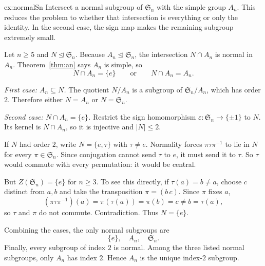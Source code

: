 \begin{solution}{ex:normalSn}
\idea Intersect a normal subgroup of $\mathfrak S_n$ with the simple group $A_n$. This reduces the problem to whether that intersection is everything or only the identity. In the second case, the sign map makes the remaining subgroup extremely small.

\writeup Let $n\ge5$ and $N\trianglelefteq\mathfrak S_n$. Because $A_n\trianglelefteq\mathfrak S_n$, the intersection $N\cap A_n$ is normal in $A_n$. Theorem~\ref{thm:an} says $A_n$ is simple, so
\[
N\cap A_n=\{e\}\qquad\text{or}\qquad N\cap A_n=A_n.
\]

\emph{First case: $A_n\subseteq N$.} The quotient $N/A_n$ is a subgroup of $\mathfrak S_n/A_n$, which has order $2$. Therefore either $N=A_n$ or $N=\mathfrak S_n$.

\emph{Second case: $N\cap A_n=\{e\}$.} Restrict the sign homomorphism $\varepsilon:\mathfrak S_n\to\{\pm1\}$ to $N$. Its kernel is $N\cap A_n$, so it is injective and $|N|\le2$.

If $N$ had order $2$, write $N=\{e,\tau\}$ with $\tau\ne e$. Normality forces $\pi\tau\pi^{-1}$ to lie in $N$ for every $\pi\in\mathfrak S_n$. Since conjugation cannot send $\tau$ to $e$, it must send it to $\tau$. So $\tau$ would commute with every permutation: it would be central.

But $Z(\mathfrak S_n)=\{e\}$ for $n\ge3$. To see this directly, if $\tau(a)=b\ne a$, choose $c$ distinct from $a,b$ and take the transposition $\pi=(b\,c)$. Since $\pi$ fixes $a$,
\[
(\pi\tau\pi^{-1})(a)=\pi(\tau(a))=\pi(b)=c\ne b=\tau(a),
\]
so $\tau$ and $\pi$ do not commute. Contradiction. Thus $N=\{e\}$.

Combining the cases, the only normal subgroups are
\[
\boxed{\{e\},\quad A_n,\quad\mathfrak S_n}.
\]
Finally, every subgroup of index $2$ is normal. Among the three listed normal subgroups, only $A_n$ has index $2$. Hence $A_n$ is the unique index-$2$ subgroup.
\end{solution}

